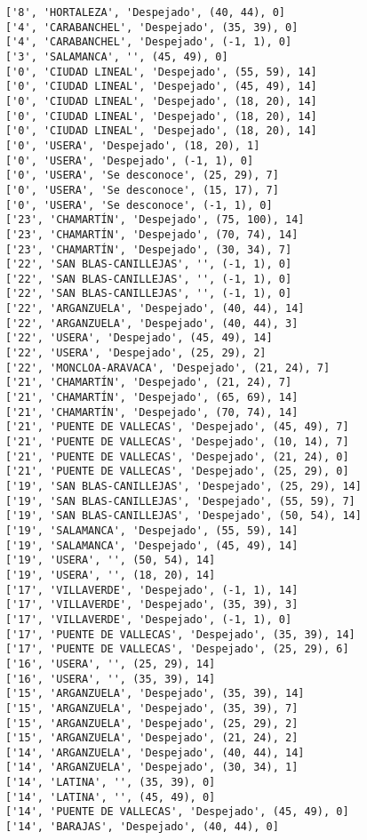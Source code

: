 \documentclass[11pt]{article}
\begin{document}
\begin{Verbatim}[commandchars=\\\{\}]
['8', 'HORTALEZA', 'Despejado', (40, 44), 0]
['4', 'CARABANCHEL', 'Despejado', (35, 39), 0]
['4', 'CARABANCHEL', 'Despejado', (-1, 1), 0]
['3', 'SALAMANCA', '', (45, 49), 0]
['0', 'CIUDAD LINEAL', 'Despejado', (55, 59), 14]
['0', 'CIUDAD LINEAL', 'Despejado', (45, 49), 14]
['0', 'CIUDAD LINEAL', 'Despejado', (18, 20), 14]
['0', 'CIUDAD LINEAL', 'Despejado', (18, 20), 14]
['0', 'CIUDAD LINEAL', 'Despejado', (18, 20), 14]
['0', 'USERA', 'Despejado', (18, 20), 1]
['0', 'USERA', 'Despejado', (-1, 1), 0]
['0', 'USERA', 'Se desconoce', (25, 29), 7]
['0', 'USERA', 'Se desconoce', (15, 17), 7]
['0', 'USERA', 'Se desconoce', (-1, 1), 0]
['23', 'CHAMARTÍN', 'Despejado', (75, 100), 14]
['23', 'CHAMARTÍN', 'Despejado', (70, 74), 14]
['23', 'CHAMARTÍN', 'Despejado', (30, 34), 7]
['22', 'SAN BLAS-CANILLEJAS', '', (-1, 1), 0]
['22', 'SAN BLAS-CANILLEJAS', '', (-1, 1), 0]
['22', 'SAN BLAS-CANILLEJAS', '', (-1, 1), 0]
['22', 'ARGANZUELA', 'Despejado', (40, 44), 14]
['22', 'ARGANZUELA', 'Despejado', (40, 44), 3]
['22', 'USERA', 'Despejado', (45, 49), 14]
['22', 'USERA', 'Despejado', (25, 29), 2]
['22', 'MONCLOA-ARAVACA', 'Despejado', (21, 24), 7]
['21', 'CHAMARTÍN', 'Despejado', (21, 24), 7]
['21', 'CHAMARTÍN', 'Despejado', (65, 69), 14]
['21', 'CHAMARTÍN', 'Despejado', (70, 74), 14]
['21', 'PUENTE DE VALLECAS', 'Despejado', (45, 49), 7]
['21', 'PUENTE DE VALLECAS', 'Despejado', (10, 14), 7]
['21', 'PUENTE DE VALLECAS', 'Despejado', (21, 24), 0]
['21', 'PUENTE DE VALLECAS', 'Despejado', (25, 29), 0]
['19', 'SAN BLAS-CANILLEJAS', 'Despejado', (25, 29), 14]
['19', 'SAN BLAS-CANILLEJAS', 'Despejado', (55, 59), 7]
['19', 'SAN BLAS-CANILLEJAS', 'Despejado', (50, 54), 14]
['19', 'SALAMANCA', 'Despejado', (55, 59), 14]
['19', 'SALAMANCA', 'Despejado', (45, 49), 14]
['19', 'USERA', '', (50, 54), 14]
['19', 'USERA', '', (18, 20), 14]
['17', 'VILLAVERDE', 'Despejado', (-1, 1), 14]
['17', 'VILLAVERDE', 'Despejado', (35, 39), 3]
['17', 'VILLAVERDE', 'Despejado', (-1, 1), 0]
['17', 'PUENTE DE VALLECAS', 'Despejado', (35, 39), 14]
['17', 'PUENTE DE VALLECAS', 'Despejado', (25, 29), 6]
['16', 'USERA', '', (25, 29), 14]
['16', 'USERA', '', (35, 39), 14]
['15', 'ARGANZUELA', 'Despejado', (35, 39), 14]
['15', 'ARGANZUELA', 'Despejado', (35, 39), 7]
['15', 'ARGANZUELA', 'Despejado', (25, 29), 2]
['15', 'ARGANZUELA', 'Despejado', (21, 24), 2]
['14', 'ARGANZUELA', 'Despejado', (40, 44), 14]
['14', 'ARGANZUELA', 'Despejado', (30, 34), 1]
['14', 'LATINA', '', (35, 39), 0]
['14', 'LATINA', '', (45, 49), 0]
['14', 'PUENTE DE VALLECAS', 'Despejado', (45, 49), 0]
['14', 'BARAJAS', 'Despejado', (40, 44), 0]

\end{Verbatim}
\end{document}
